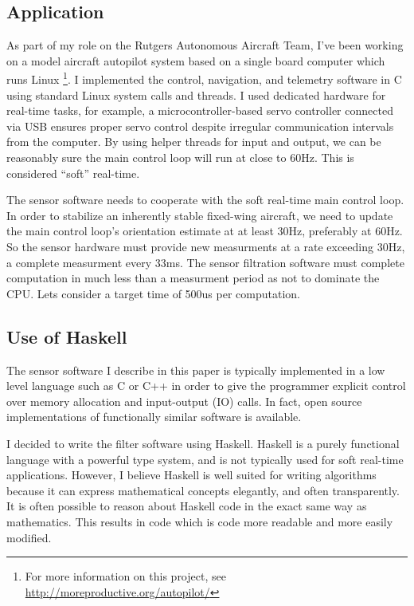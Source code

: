\documentclass[12pt]{report}
\begin{document}
\subsection{Application}

As part of my role on the Rutgers Autonomous Aircraft Team, I've been working on a model aircraft autopilot system based on a single board computer which runs Linux \footnote{For more information on this project, see \url{http://moreproductive.org/autopilot/}}. I implemented the control, navigation, and telemetry software in C using standard Linux system calls and threads. I used dedicated hardware for real-time tasks, for example, a microcontroller-based servo controller connected via USB ensures proper servo control despite irregular communication intervals from the computer. 
By using helper threads for input and output, we can be reasonably sure the main control loop will run at close to 60Hz. This is considered ``soft'' real-time.

The sensor software needs to cooperate with the soft real-time main control loop. In order to stabilize an inherently stable fixed-wing aircraft, we need to update the main control loop's orientation estimate at at least 30Hz, preferably at 60Hz. So the sensor hardware must provide new measurments at a rate exceeding 30Hz, a complete measurment every 33ms. The sensor filtration software must complete computation in much less than a measurment period as not to dominate the CPU. Lets consider a target time of 500us per computation.

\subsection{Use of Haskell}

The sensor software I describe in this paper is typically implemented in a low level language such as C or C++ in order to give the programmer explicit control over memory allocation and input-output (IO) calls. In fact, open source implementations of functionally similar software is available. 

I decided to write the filter software using Haskell. Haskell is a purely functional language with a powerful type system, and is not typically used for soft real-time applications. However, I believe Haskell is well suited for writing algorithms because it can express mathematical concepts elegantly, and often transparently. It is often possible to reason about Haskell code in the exact same way as mathematics. This results in code which is code more readable and more easily modified. 
\end{document}
